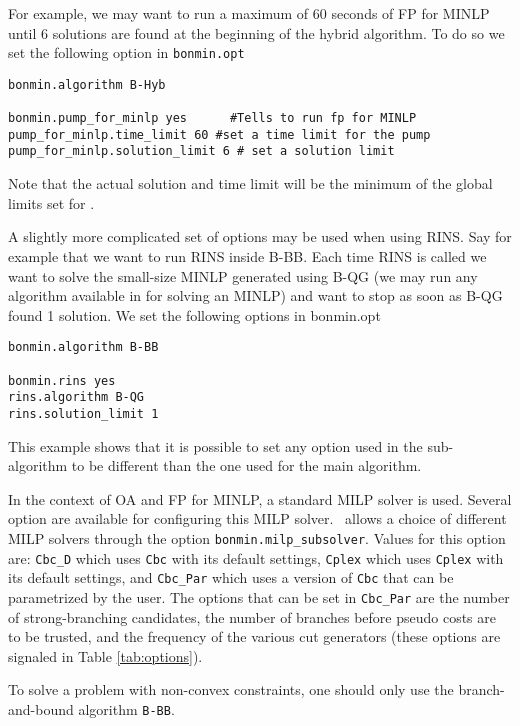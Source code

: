 For example, we may want to run a maximum of 60 seconds of FP for MINLP until 6 solutions are found at the beginning of the hybrid algorithm. To do so 
we set the following option in {\tt bonmin.opt}
\begin{verbatim}
bonmin.algorithm B-Hyb

bonmin.pump_for_minlp yes      #Tells to run fp for MINLP
pump_for_minlp.time_limit 60 #set a time limit for the pump
pump_for_minlp.solution_limit 6 # set a solution limit

\end{verbatim}

Note that the actual solution and time limit will be the minimum of the global limits set for \Bonmin.

A slightly more complicated set of options may be used when using RINS. Say for example that we want to run RINS inside B-BB. Each time RINS is called we want
to solve the small-size MINLP generated using B-QG (we may run any algorithm available in \Bonmin for solving an MINLP) and want to stop as soon as B-QG found 1 solution.
We set the following options in bonmin.opt

\begin{verbatim}
bonmin.algorithm B-BB

bonmin.rins yes
rins.algorithm B-QG
rins.solution_limit 1

\end{verbatim}
This example shows that it is possible to set any option used in the sub-algorithm to be different than the one used for the main algorithm.


In the context of OA and FP for MINLP, a standard MILP solver is used.
Several option are available for configuring this MILP solver.
\Bonmin\ allows a choice of different MILP solvers through the option
{\tt bonmin.milp\_subsolver}. Values for this option are: {\tt Cbc\_D} which uses {\tt Cbc} with its
default settings, {\tt Cplex} which uses {\tt Cplex} with its default settings, and
{\tt Cbc\_Par} which uses a version of {\tt Cbc} that can be parametrized by the user.
The options that can be set in {\tt Cbc\_Par} are the number of strong-branching candidates,
the number of branches before pseudo costs are to be trusted, and the frequency of the various cut generators
(these options are signaled in Table \ref{tab:options}).

\label{sec:non_convex}
To solve a problem with non-convex constraints, one should only use the branch-and-bound algorithm {\tt B-BB}.


